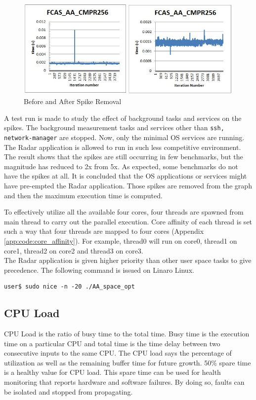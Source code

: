 \begin{figure}[h!]
	\centering
	\includegraphics[width=150mm]{figures/chop_off}
	\caption{Before and After Spike Removal}
	\label{fig:mm:chop_off}
\end{figure}
A test run is made to study the effect of background tasks and services on the spikes. The background measurement tasks and services other than \verb|ssh, network-manager| are stopped. Now, only the minimal OS services are running. The Radar application is allowed to run in such less competitive environment. The result shows that the spikes are still occurring in few benchmarks, but the magnitude has reduced to 2x from 5x. As expected, some benchmarks do not have the spikes at all. It is concluded that the OS applications or services might have pre-empted the Radar application. Those spikes are removed from the graph and then the maximum execution time is computed. \vspace*{0.2cm}

To effectively utilize all the available four cores, four threads are spawned from main thread to carry out the parallel execution. Core affinity of each thread is set such a way that four threads are mapped to four cores (Appendix \ref{app:code:core_affinity}). For example, thread0 will run on core0, thread1 on core1, thread2 on core2 and thread3 on core3. \\

The Radar application is given higher priority than other user space tasks to give precedence. The following command is issued on Linaro Linux. 
\begin{lstlisting}
user$ sudo nice -n -20 ./AA_space_opt
\end{lstlisting}

\subsection{CPU Load}
\label{ss:mm:cpu_load}
CPU Load is the ratio of busy time to the total time. Busy time is the execution time on a particular CPU and total time is the time delay between two consecutive inputs to the same CPU. The CPU load says the percentage of utilization as well as the remaining buffer time for future growth. 50\% spare time is a healthy value for CPU load. This spare time can be used for health monitoring that reports hardware and software failures. By doing so, faults can be isolated and stopped from propagating.

